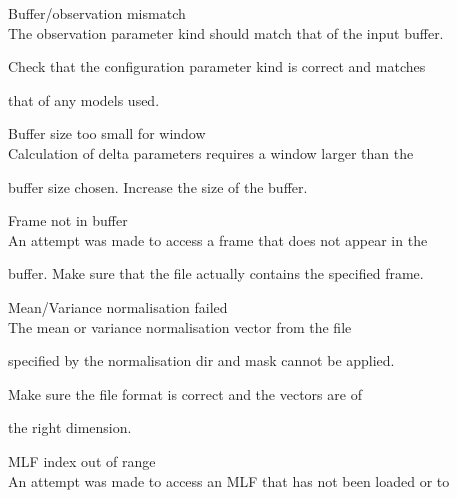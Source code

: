 \begin{itemize}
\begin{itemize}
    Buffer/observation mismatch\\


        The observation parameter kind should match that of the input buffer.


        Check that the configuration parameter kind is correct and matches 


        that of any models used.





    Buffer size too small for window\\


        Calculation of delta parameters requires a window larger than the


        buffer size chosen.  Increase the size of the buffer.





    Frame not in buffer\\


        An attempt was made to access a frame that does not appear in the 


        buffer.  Make sure that the file actually contains the specified frame.





    Mean/Variance normalisation failed\\


        The mean or variance normalisation vector from the file


        specified by the normalisation dir and mask cannot be applied.


        Make sure the file format is correct and the vectors are of


        the right dimension.





\end{itemize}










\begin{itemize}


    MLF index out of range\\


        An attempt was made to access an MLF that has not been loaded or to 



\end{itemize}
\end{itemize}
